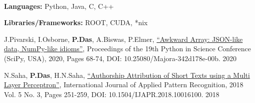 \documentclass[10pt, letterpaper]{fulldeps}
\begin{document}
%
%
\vspace{-5pt}
\\
\vspace{-20pt}

%
%
\vspace{-5pt}
\textbf{Languages:} Python, Java, C, C++

\textbf{Libraries/Frameworks:} ROOT, CUDA, *nix
\vspace{-6pt}

%
%
\small{\begin{tightitemize}
    \item J.Pivarski, I.Osborne, {\textbf{P.Das}}, A.Biswas, P.Elmer, {\href{http://conference.scipy.org/proceedings/scipy2020/jim_pivarski.html}{``Awkward Array: JSON-like data, NumPy-like idioms''}}, Proceedings of the 19th Python in Science Conference (SciPy, USA), 2020, Pages 68-74, DOI: 10.25080/Majora-342d178e-00b. \hfill{2020}
    \item N.Saha, {\textbf{P.Das}}, H.N.Saha, {\href{https://www.inderscienceonline.com/doi/abs/10.1504/IJAPR.2018.094819}{``Authorship Attribution of Short Texts using a Multi Layer Perceptron''}}, International Journal of Applied Pattern Recognition, 2018 Vol. 5 No. 3, Pages 251-259, DOI: 10.1504/IJAPR.2018.10016100. \hfill{2018}
\end{tightitemize}}
\end{document}
